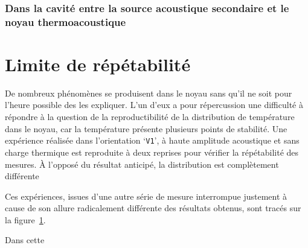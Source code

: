 \subsubsection{Dans la cavité entre la source acoustique secondaire et le noyau thermoacoustique}

%    
%
%    

\section{Limite de répétabilité}

De nombreux phénomènes se produisent dans le noyau sans qu'il ne soit pour l'heure possible des les expliquer. L'un d'eux a pour répercussion une difficulté à répondre à la question de la reproductibilité de la distribution de température dans le noyau, car la température présente plusieurs points de stabilité. Une expérience réalisée dans l'orientation `\texttt{V1}', à haute amplitude acoustique et sans charge thermique est reproduite à deux reprises pour vérifier la répétabilité des mesures. À l'opposé du résultat anticipé, la distribution est complètement différente   

Ces expériences, issues d'une autre série de mesure interrompue justement à cause de son allure radicalement différente des résultats obtenus, sont tracés sur la figure~\ref{fig:Repetabilite_V1}.

\begin{figure}[!ht]
    \centering
    
    \caption{}
    \label{fig:Repetabilite_V1}
\end{figure}

Dans cette

